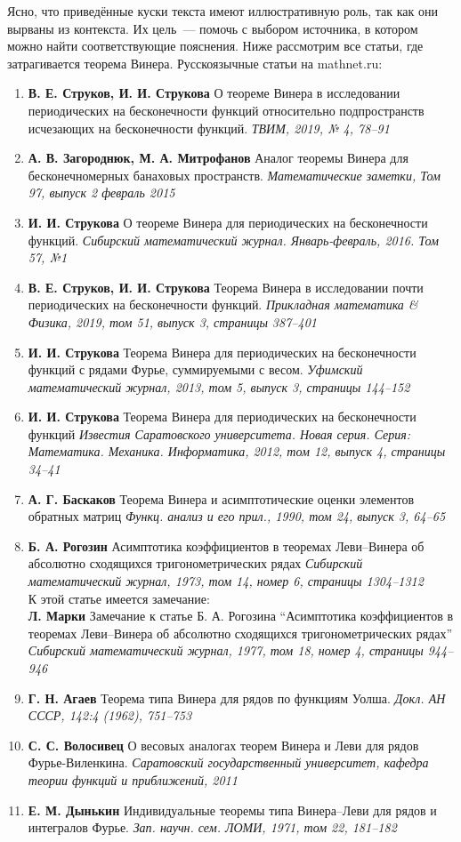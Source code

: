 \documentclass[12pt]{extarticle}
\theoremstyle{definition}
\begin{document}
  	 Ясно, что приведённые куски текста имеют иллюстративную роль, так как они вырваны из контекста. Их цель~--- помочь с выбором источника, в котором можно найти соответствующие пояснения. Ниже рассмотрим все статьи, где затрагивается теорема Винера. Русскоязычные статьи на mathnet.ru:
  	\begin{enumerate}
  		\item \textbf{В. Е. Струков, И. И. Струкова} О теореме Винера в исследовании периодических на бесконечности функций относительно подпространств исчезающих на бесконечности функций. \textit{ТВИМ, 2019, № 4, 78–91}
		\item \textbf{А. В. Загороднюк, М. А. Митрофанов} Аналог теоремы Винера для бесконечномерных банаховых пространств. \textit{Математические заметки, Том 97, выпуск 2 февраль 2015}
		\item \textbf{И. И. Струкова} О теореме Винера для периодических на бесконечности функций. \textit{Сибирский математический журнал. Январь-февраль, 2016. Том 57, №1}
		\item \textbf{В. Е. Струков, И. И. Струкова} Теорема Винера в исследовании почти периодических на бесконечности функций. \textit{Прикладная математика \& Физика, 2019, том 51, выпуск 3, страницы 387–401}
		\item \textbf{И. И. Струкова} Теорема Винера для периодических на бесконечности функций с рядами Фурье, суммируемыми с весом. \textit{Уфимский математический журнал, 2013, том 5, выпуск 3, страницы 144–152}
		\item \textbf{И. И. Струкова} Теорема Винера для периодических на бесконечности функций \textit{Известия Саратовского университета. Новая серия. Серия: Математика. Механика. Информатика, 2012, том 12, выпуск 4, страницы 34–41}
		\item \textbf{А. Г. Баскаков} Теорема Винера и асимптотические оценки элементов обратных матриц \textit{Функц.
			анализ и его прил., 1990, том 24, выпуск 3, 64–65}
		\item \textbf{Б. А. Рогозин} Асимптотика коэффициентов в теоремах Леви–Винера об абсолютно сходящихся тригонометрических рядах \textit{Сибирский математический журнал, 1973, том 14, номер 6, страницы 1304–1312}\\
		 К этой статье имеется замечание:\\ \textbf{Л. Марки} Замечание к статье Б. А. Рогозина “Асимптотика коэффициентов в теоремах Леви–Винера об абсолютно сходящихся тригонометрических рядах” \textit{Сибирский математический журнал, 1977, том 18, номер 4, страницы 944–946}
		 \item \textbf{Г. Н. Агаев} Теорема типа Винера для рядов по функциям Уолша. \textit{Докл. АН СССР, 142:4 (1962), 751–753}
		 \item \textbf{С. С. Волосивец} О весовых аналогах теорем Винера и Леви для рядов Фурье-Виленкина. \textit{Саратовский государственный университет, кафедра теории функций и приближений, 2011}
		 \item \textbf{Е. М. Дынькин} Индивидуальные теоремы типа Винера–Леви для рядов и интегралов Фурье. \textit{Зап. научн. сем. ЛОМИ, 1971, том 22, 181–182}
  	\end{enumerate}
\end{document}
